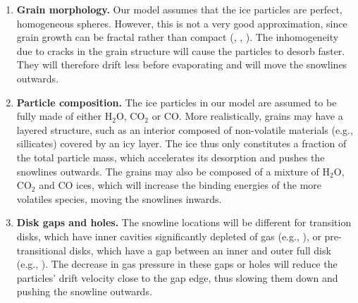 \documentclass[apj]{emulateapj}
\begin{document}
\begin{enumerate}
\item \textbf{Grain morphology.} Our model assumes that the ice particles are perfect, homogeneous spheres. However, this is not a very good approximation, since grain growth can be fractal rather than compact (\citealt{zsom10}, \citealt{okuzumi12}, \citealt{krijt15}). The inhomogeneity due to cracks in the grain structure will cause the particles to desorb faster. They will therefore drift less before evaporating and will move the snowlines outwards.

\item \textbf{Particle composition.} The ice particles in our model are assumed to be fully made of either H$_2$O, CO$_2$ or CO. More realistically, grains may have a layered structure, such as an interior composed of non-volatile materials (e.g., sillicates) covered by an icy layer. The ice thus only constitutes a fraction of the total particle mass, which accelerates its desorption and pushes the snowlines outwards. The grains may also be composed of a mixture of H$_2$O, CO$_2$ and CO ices, which will increase the binding energies of the more volatiles species, moving %
the snowlines inwards. 


\item \textbf{Disk gaps and holes.} The snowline locations will be different for transition disks, which have inner cavities significantly depleted of gas (e.g., \citealt{espaillat12}), or pre-transitional disks, which have a gap between an inner and outer full disk (e.g., \citealt{kraus11}). The decrease in gas pressure in these gaps or holes will reduce the particles' drift velocity close to the gap edge, thus slowing them down and pushing the snowline outwards.


\end{enumerate}
\end{document}
